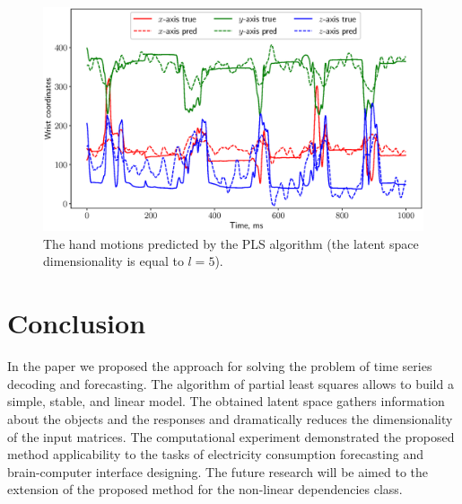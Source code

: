 \documentclass[12pt,twoside]{article}
\begin{document}
\begin{figure}[!h]
	\centering
	\includegraphics[width=\textwidth]{figs/ecog_prediction}
	\caption{The hand motions predicted by the PLS algorithm (the latent space dimensionality is equal to $l=5$).}
	\label{fig::ecog_prediction}
\end{figure}

\section{Conclusion}
In the paper we proposed the approach for solving the problem of time series decoding and forecasting. 
The algorithm of partial least squares allows to build a simple, stable, and linear model. 
The obtained latent space gathers information about the objects and the responses and dramatically reduces the dimensionality of the input matrices. 
The computational experiment demonstrated the proposed method applicability to the tasks of electricity consumption forecasting and brain-computer interface designing.
The future research will be aimed to the extension of the proposed method for the non-linear dependencies class.



\end{document}
